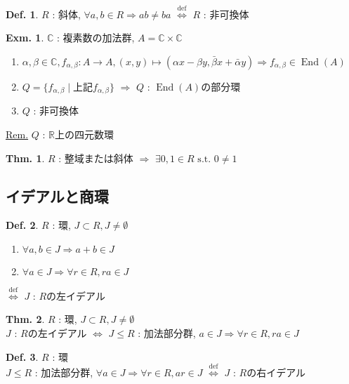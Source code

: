 \documentclass[uplatex,dvipdfmx,9pt]{beamer}
\newcommand{\defarrow}{\overset{\mathrm{def}}{\Leftrightarrow}}
\newcommand{\st}{\text{ s.t. }}
\newcommand{\End}{\operatorname{End}}
\newcommand{\sscount}{\textsection \thesubsection}
\newcounter{textExmCount}
\theoremstyle{definition} %
\newtheorem{defn}{Def.}[subsection] %
\newtheorem{thm}{Thm.}[subsection] %
\theoremstyle{example}
\newtheorem{exmText}[textExmCount]{Exm.}
\begin{document}
    \begin{frame}

      \begin{defn}
        $R$ : 斜体, $\forall a,b \in R \Rightarrow ab \neq ba$ $\defarrow$ $R$ : \alert{非可換体}
      \end{defn}

      \begin{exmText}
        $\mathbb{C}$ : 複素数の加法群, $A = \mathbb{C} \times \mathbb{C}$
        \begin{enumerate}
          \item $\alpha, \beta \in \mathbb{C}, f_{\alpha, \beta}\colon A \to A, (x,y) \mapsto (\alpha x - \beta y, \bar{\beta} x + \bar{\alpha} y) \Rightarrow f_{\alpha, \beta} \in \End(A)$
          \item $Q = \{f_{\alpha, \beta} \mid \text{上記$f_{\alpha, \beta}$}\}$ $\Rightarrow$ $Q$ : $\End(A)$の部分環
          \item $Q$ : 非可換体
        \end{enumerate}
      \end{exmText}
      \underline{Rem.} $Q$ : $\mathbb{R}$上の\alert{四元数環}

      \begin{thm}
        $R$ : 整域または斜体 $\Rightarrow$ $\exists 0, 1 \in R \st 0 \neq 1$
      \end{thm}
      
    \end{frame}

    \subsection{\sscount イデアルと商環}
    \setcounter{textExmCount}{0}

    \begin{frame}

      \begin{defn}
        $R$ : 環, $J \subset R, J \neq \emptyset$
        \begin{enumerate}
          \item $\forall a, b \in J \Rightarrow a + b \in J$
          \item $\forall a \in J \Rightarrow \forall r \in R, ra \in J$
        \end{enumerate}
        $\defarrow$ $J$ : $R$の\alert{左イデアル}
      \end{defn}

      \begin{thm}
        $R$ : 環, $J \subset R, J \neq \emptyset$ \\
        $J$ : $R$の左イデアル $\Leftrightarrow$ $J \le R$ : 加法部分群, $a \in J \Rightarrow \forall r \in R, ra \in J$
      \end{thm}

      \begin{defn}
        $R$ : 環 \\
        $J \le R$ : 加法部分群, $\forall a \in J \Rightarrow \forall r \in R, ar \in J$ $\defarrow$ $J$ : $R$の\alert{右イデアル}
      \end{defn}

    \end{frame}
\end{document}
